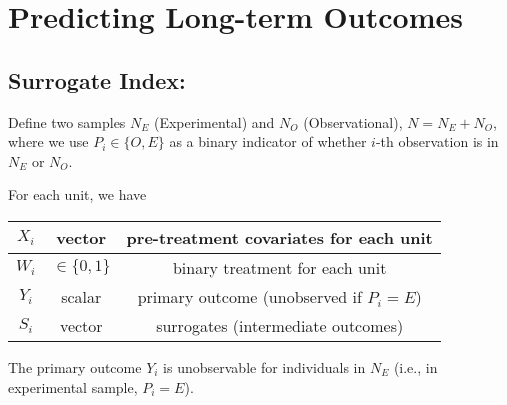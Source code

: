 \chapter{Predicting Long-term Outcomes}
\section{Surrogate Index: \cite{athey2019surrogate}}
Define two samples $N_E$ (Experimental) and $N_O$ (Observational), $N=N_E+N_O$, where we use $P_i\in\{O,E\}$ as a binary indicator of whether $i$-th observation is in $N_E$ or $N_O$.

For each unit, we have
\begin{center}
    \begin{tabular}{ccc}
        \hline
            $X_i$& vector & pre-treatment covariates for each unit\\
        \hline
            $W_i$& $\in\{0,1\}$ & binary treatment for each unit\\
        \hline
            $Y_i$& scalar & primary outcome (unobserved if $P_i=E$)\\
            $S_i$& vector &surrogates (intermediate outcomes)
        \hline
    \end{tabular}
\end{center}
The primary outcome $Y_i$ is unobservable for individuals in $N_E$ (i.e., in experimental sample, $P_i=E$).